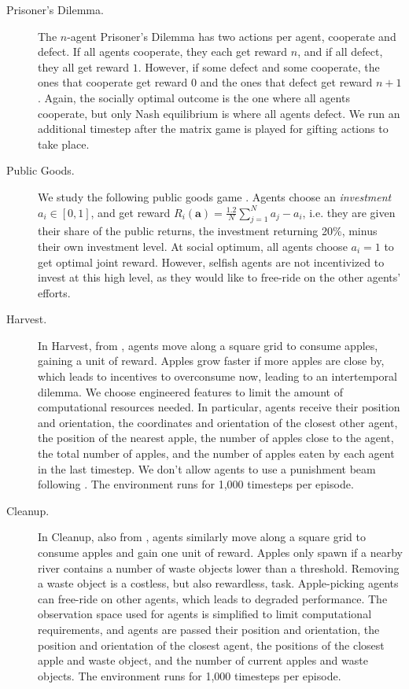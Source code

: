 \documentclass[referee,sn-basic]{sn-jnl}
\theoremstyle{thmstyleone}%
\theoremstyle{thmstyletwo}%
\theoremstyle{thmstylethree}%
\begin{document}
\begin{description}
    \item[Prisoner's Dilemma.] The $n$-agent Prisoner's Dilemma has two actions per agent, cooperate and defect. If all agents cooperate, they each get reward $n$, and if all defect, they all get reward $1$. However, if some defect and some cooperate, the ones that cooperate get reward $0$ and the ones that defect get reward $n+1$. Again, the socially optimal outcome is the one where all agents cooperate, but only Nash equilibrium is where all agents defect. We run an additional timestep after the matrix game is played for gifting actions to take place.
    \item[Public Goods.] We study the following public goods game \cite{janssen2003adaptation}. Agents choose an \emph{investment} $a_i \in [0, 1]$, and get reward $R_i(\mathbf a) =  \frac{1.2}{N} \sum_{j=1}^N a_j - a_i$, i.e. they are given their share of the public returns, the investment returning 20\%, minus their own investment level. At social optimum, all agents choose $a_i=1$ to get optimal joint reward. However, selfish agents are not incentivized to invest at this high level, as they would like to free-ride on the other agents' efforts. 
    \item[Harvest.] In Harvest, from \citet{hughes2018inequity}, agents move along a square grid to consume apples, gaining a unit of reward. Apples grow faster if more apples are close by, which leads to incentives to overconsume now, leading to an intertemporal dilemma. We choose engineered features to limit the amount of computational resources needed. In particular, agents receive their position and orientation, the coordinates and orientation of the closest other agent, the position of the nearest apple, the number of apples close to the agent, the total number of apples, and the number of apples eaten by each agent in the last timestep. We don't allow agents to use a punishment beam following \citet{lupu2020gifting}. The environment runs for 1,000 timesteps per episode. 
    \item[Cleanup.] In Cleanup, also from \cite{hughes2018inequity}, agents similarly move along a square grid to consume apples and gain one unit of reward. Apples only spawn if a nearby river contains a number of waste objects lower than a threshold. Removing a waste object is a costless, but also rewardless, task. Apple-picking agents can free-ride on other agents, which leads to degraded performance. The observation space used for agents is simplified to limit computational requirements, and agents are passed their position and orientation, the position and orientation of the closest agent, the positions of the closest apple and waste object, and the number of current apples and waste objects. The environment runs for 1,000 timesteps per episode. 

\end{description}
\end{document}

